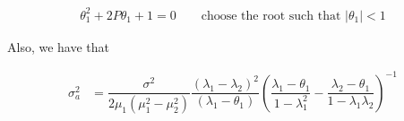 \documentclass[12pt]{article}
\begin{document}
\begin{align}
\theta_{1}^{2} + 2P\theta_{1} + 1 = 0 \qquad \text{choose the root such that $|\theta_{1}| < 1$}
\end{align}


Also, we have that

\begin{align}
\sigma_{a}^{2} &= \dfrac{\sigma^2}{2\mu_{1}(\mu_{1}^{2} - \mu_{2}^{2})} \dfrac{(\lambda_{1} - \lambda_{2})^2}{(\lambda_{1} - \theta_{1})} \left(\dfrac{\lambda_{1} - \theta_{1}}{1 - \lambda_{1}^{2}} - \dfrac{\lambda_{2} - \theta_{1}}{1 - \lambda_{1}\lambda_{2}}\right)^{-1}
\end{align}
\end{document}
